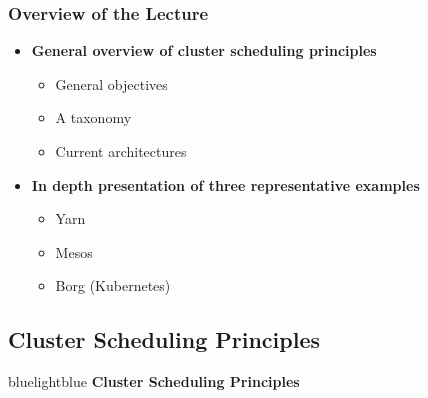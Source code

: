 
\begin{frame}
\frametitle{Overview of the Lecture}
\begin{itemize}
	\item {\bf General overview of cluster scheduling principles}
	\begin{itemize}
		\item General objectives
		\item A taxonomy
		\item Current architectures
	\end{itemize}

\vspace{20pt}
	
	\item {\bf In depth presentation of three representative examples}
	\begin{itemize}
		\item Yarn
		\item Mesos
		\item Borg (Kubernetes)
	\end{itemize}
\end{itemize}
\end{frame}

\subsection{Cluster Scheduling Principles}
\begin{frame}
 \begin{colorblock}{blue}{lightblue}{ }
    \Large \textbf{Cluster Scheduling Principles}
  \end{colorblock}
\end{frame}


